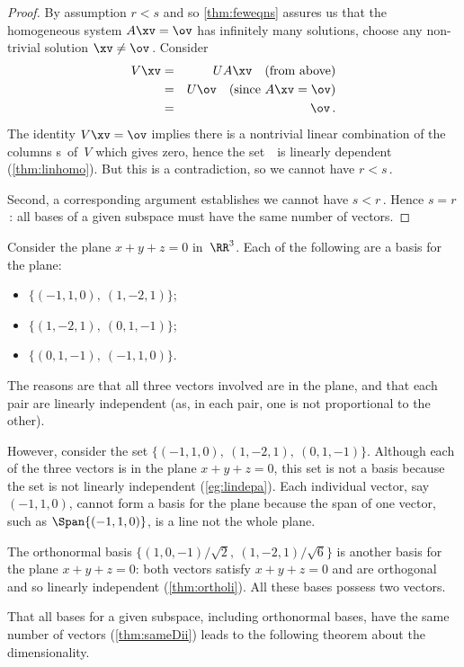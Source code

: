 \begin{proof}
By assumption \(r<s\) and so \cref{thm:feweqns} assures us that the homogeneous system \(A\xv=\ov\) has infinitely many solutions, choose any non-trivial solution \(\xv\neq\ov\)\,.
Consider 
\begin{eqnarray*}
V\xv&=& UA\xv\quad(\text{from above})
\\&=&U\ov\quad(\text{since }A\xv=\ov)
\\&=&\ov\,.
\end{eqnarray*}
The identity \(V\xv=\ov\) implies there is a nontrivial linear combination of the columns \hlist\vv s\ of~\(V\) which gives zero, hence the set~\cV\ is linearly dependent (\cref{thm:linhomo}).  
But this is a contradiction, so we cannot have \(r<s\)\,.

Second, a corresponding argument establishes we cannot have \(s<r\)\,.
Hence \(s=r\)\,: all bases of a given subspace must have the same number of vectors.
\end{proof}



\begin{example} \label{eg:samedi}
Consider the plane \(x+y+z=0\) in~\(\RR^3\).
Each of the following are a basis for the plane:
\begin{itemize}
\item \(\{(-1,1,0),\ (1,-2,1)\}\);
\item \(\{(1,-2,1),\ (0,1,-1)\}\); 
\item \(\{(0,1,-1),\ (-1,1,0)\}\).
\end{itemize}
The reasons are that all three vectors involved are in the plane, and that each pair are linearly independent (as, in each pair, one is not proportional to the other).

However, consider the set \(\{(-1,1,0),\ (1,-2,1),\ (0,1,-1)\}\).
Although each of the three vectors is in the plane \(x+y+z=0\), this set is not a basis because the set is not linearly independent (\cref{eg:lindepa}).
Each individual vector, say \((-1,1,0)\), cannot form a basis for the plane because the span of one vector, such as \(\Span\{(-1,1,0)\}\), is a line not the whole plane.

The orthonormal basis \(\big\{(1,0,-1)/\sqrt2,\ (1,-2,1)/\sqrt6\big\}\) is another basis for the plane \(x+y+z=0\): both vectors satisfy \(x+y+z=0\) and are orthogonal and so linearly independent (\cref{thm:ortholi}).  
All these bases possess two vectors.
\end{example}

That all bases for a given subspace, including orthonormal bases, have the same number of vectors (\cref{thm:sameDii}) leads to the following theorem about the dimensionality.

